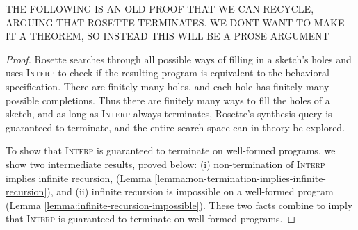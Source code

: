 {\color{green}
THE FOLLOWING IS AN OLD PROOF THAT WE CAN RECYCLE, ARGUING THAT ROSETTE TERMINATES. WE DONT WANT TO MAKE IT A THEOREM, SO INSTEAD THIS WILL BE A PROSE ARGUMENT
\begin{proof}
Rosette searches through
  all possible ways of
  filling in a sketch's holes
  and uses \textsc{Interp} to
  check if the resulting program
  is equivalent to the behavioral
  specification.
There are finitely many holes,
  and each hole has
  finitely many possible completions.
Thus there are finitely many ways to
    fill the holes of a sketch,
    and as long as \textsc{Interp} always
    terminates, Rosette's synthesis query
    is guaranteed to terminate, and the
    entire search space can in theory
    be explored.

To show that \textsc{Interp} is guaranteed
    to terminate on well-formed programs,
    we show two intermediate results,
    proved below: 
    (i) non-termination of \textsc{Interp}
    implies infinite recursion, 
    (Lemma \ref{lemma:non-termination-implies-infinite-recursion}),
    and (ii) infinite recursion is impossible on
    a well-formed program
    (Lemma \ref{lemma:infinite-recursion-impossible}).
These two facts 
    combine to imply that \textsc{Interp}
    is guaranteed to terminate on well-formed
    programs.
\end{proof}
}